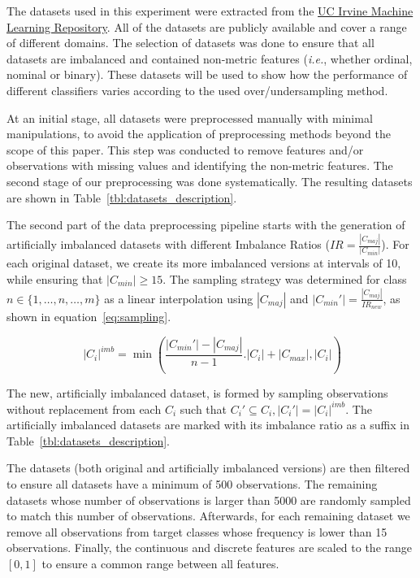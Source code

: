 \documentclass[parskip=full]{scrartcl}
\begin{document}
The datasets used in this experiment were extracted from the
\href{https://archive.ics.uci.edu}{UC Irvine Machine Learning Repository}. All
of the datasets are publicly available and cover a range of different domains.
The selection of datasets was done to ensure that all datasets are imbalanced
and contained non-metric features (\textit{i.e.}, whether ordinal, nominal or
binary). These datasets will be used to show how the performance of different
classifiers varies according to the used over/undersampling method.

At an initial stage, all datasets were preprocessed manually with minimal
manipulations, to avoid the application of preprocessing methods beyond the
scope of this paper. This step was conducted to remove features and/or
observations with missing values and identifying the non-metric features. The
second stage of our preprocessing was done systematically. The resulting
datasets are shown in Table~\ref{tbl:datasets_description}.



The second part of the data preprocessing pipeline starts with the generation
of artificially imbalanced datasets with different Imbalance Ratios
($IR=\frac{|C_{maj}|}{|C_{min}|}$). For
each original dataset, we create its more imbalanced versions at intervals of
10, while ensuring that $|C_{min}| \ge 15$. The sampling strategy was
determined for class $n \in \{1,\ldots,n,\ldots,m\}$ as a linear interpolation using $|C_{maj}|$ and
$|C_{min}'|=\frac{|C_{maj}|}{IR_{new}}$, as shown in equation~\ref{eq:sampling}.

\begin{equation}~\label{eq:sampling}
    |C_i|^{imb} =
    \min(\frac{|C_{min}'|-|C_{maj}|}{n-1}.|C_i|+|C_{max}|, |C_i|)
\end{equation}

The new, artificially imbalanced dataset, is formed by sampling observations
without replacement from each $C_i$ such that $C_i' \subseteq C_i , |C_i'| =
|C_i|^{imb}$. The artificially imbalanced datasets are marked with its
imbalance ratio as a suffix in Table~\ref{tbl:datasets_description}.

The datasets (both original and artificially imbalanced versions) are then
filtered to ensure all datasets have a minimum of 500 observations.  The
remaining datasets whose number of observations is larger than 5000 are
randomly sampled to match this number of observations. Afterwards, for each
remaining dataset we remove all observations from target classes whose
frequency is lower than 15 observations. Finally, the continuous and discrete
features are scaled to the range $[0,1]$ to ensure a common range between all
features. 
\end{document}
